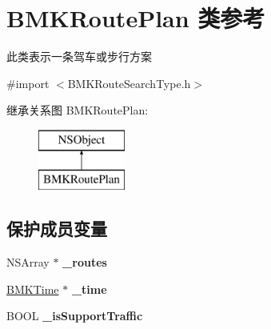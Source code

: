 \hypertarget{interface_b_m_k_route_plan}{\section{B\-M\-K\-Route\-Plan 类参考}
\label{interface_b_m_k_route_plan}
}


此类表示一条驾车或步行方案  




{\ttfamily \#import $<$B\-M\-K\-Route\-Search\-Type.\-h$>$}

继承关系图 B\-M\-K\-Route\-Plan\-:\begin{figure}[H]
\begin{center}
\leavevmode
\includegraphics[height=2.000000cm]{interface_b_m_k_route_plan}
\end{center}
\end{figure}
\subsection*{保护成员变量}
\begin{DoxyCompactItemize}
\item 
\hypertarget{interface_b_m_k_route_plan_aa62820a95ab248f113a882b864230135}{N\-S\-Array $\ast$ {\bfseries \-\_\-routes}}\label{interface_b_m_k_route_plan_aa62820a95ab248f113a882b864230135}

\item 
\hypertarget{interface_b_m_k_route_plan_a4cb33a70d8ccb68be849066fd5c3bbf0}{\hyperlink{interface_b_m_k_time}{B\-M\-K\-Time} $\ast$ {\bfseries \-\_\-time}}\label{interface_b_m_k_route_plan_a4cb33a70d8ccb68be849066fd5c3bbf0}

\item 
\hypertarget{interface_b_m_k_route_plan_a09571d9877932dd750cf4cc2ec80bb6e}{B\-O\-O\-L {\bfseries \-\_\-is\-Support\-Traffic}}\label{interface_b_m_k_route_plan_a09571d9877932dd750cf4cc2ec80bb6e}

\end{DoxyCompactItemize}
